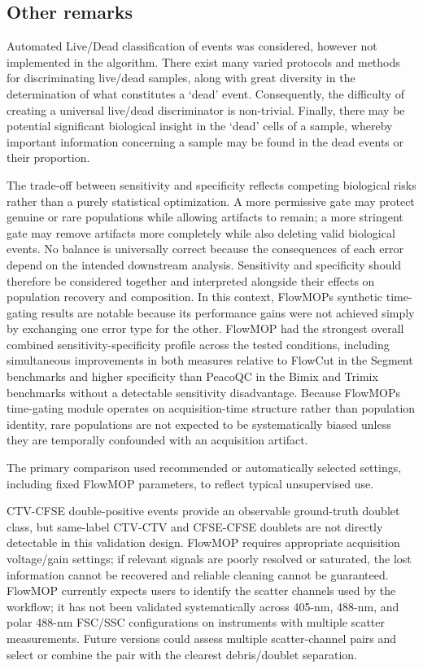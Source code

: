\documentclass[ASNA]{latex/wiley/USG}
\begin{document}
\subsection{Other remarks}\label{other-remarks}

Automated Live/Dead classification of events was considered, however not
implemented in the algorithm. There exist many varied protocols and
methods for discriminating live/dead samples, along with great diversity
in the determination of what constitutes a `dead' event. Consequently,
the difficulty of creating a universal live/dead discriminator is
non-trivial. Finally, there may be potential significant biological
insight in the `dead' cells of a sample, whereby important information
concerning a sample may be found in the dead events or their proportion.

The trade-off between sensitivity and specificity reflects competing
biological risks rather than a purely statistical optimization. A more
permissive gate may protect genuine or rare populations while allowing
artifacts to remain; a more stringent gate may remove artifacts more
completely while also deleting valid biological events. No balance is
universally correct because the consequences of each error depend on the
intended downstream analysis. Sensitivity and specificity should
therefore be considered together and interpreted alongside their effects
on population recovery and composition. In this context,
FlowMOP\textquotesingle s synthetic time-gating results are notable
because its performance gains were not achieved simply by exchanging one
error type for the other. FlowMOP had the strongest overall combined
sensitivity-specificity profile across the tested conditions, including
simultaneous improvements in both measures relative to FlowCut in the
Segment benchmarks and higher specificity than PeacoQC in the Bimix and
Trimix benchmarks without a detectable sensitivity disadvantage. Because
FlowMOP\textquotesingle s time-gating module operates on
acquisition-time structure rather than population identity, rare
populations are not expected to be systematically biased unless they are
temporally confounded with an acquisition artifact.

The primary comparison used recommended or automatically selected
settings, including fixed FlowMOP parameters, to reflect typical
unsupervised use.

CTV-CFSE double-positive events provide an observable ground-truth
doublet class, but same-label CTV-CTV and CFSE-CFSE doublets are not
directly detectable in this validation design. FlowMOP requires
appropriate acquisition voltage/gain settings; if relevant signals are
poorly resolved or saturated, the lost information cannot be recovered
and reliable cleaning cannot be guaranteed. FlowMOP currently expects
users to identify the scatter channels used by the workflow; it has not
been validated systematically across 405-nm, 488-nm, and polar 488-nm
FSC/SSC configurations on instruments with multiple scatter
measurements. Future versions could assess multiple scatter-channel
pairs and select or combine the pair with the clearest debris/doublet
separation.
\end{document}
